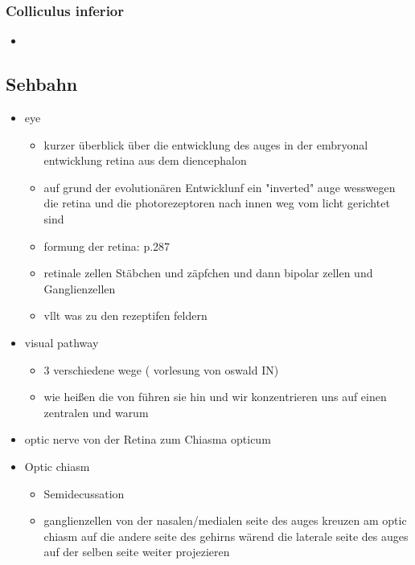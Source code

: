 \documentclass[12pt,a4paper,pdftex]{article}
\begin{document}
\subsubsection{Colliculus inferior}

    \begin{itemize}
        \item 
    \end{itemize}



\subsection{Sehbahn}
\begin{itemize}
    \item eye
    \begin{itemize}
        \item kurzer überblick über die entwicklung des auges in der embryonal entwicklung retina aus dem diencephalon
        \item auf grund der evolutionären Entwicklunf ein "inverted" auge wesswegen die retina und die photorezeptoren nach innen weg vom licht gerichtet sind
        \item formung der retina: \cite{smith2008biology} p.287
        \item retinale zellen Stäbchen und zäpfchen und dann bipolar zellen und Ganglienzellen 
        \item vllt was zu den rezeptifen feldern
    \end{itemize}
    \item visual pathway
    \begin{itemize}
        \item 3 verschiedene wege ( vorlesung von oswald IN)
        \item wie heißen die von führen sie hin und wir konzentrieren uns auf einen zentralen und warum
    \end{itemize}
    \item optic nerve von der Retina zum Chiasma opticum
    \item Optic chiasm    
    \begin{itemize}
        \item Semidecussation  
        \item ganglienzellen von der nasalen/medialen seite des auges kreuzen am optic chiasm auf die andere seite des gehirns wärend die laterale seite des auges auf der selben seite weiter projezieren

\end{itemize}
\end{itemize}
\end{document}
